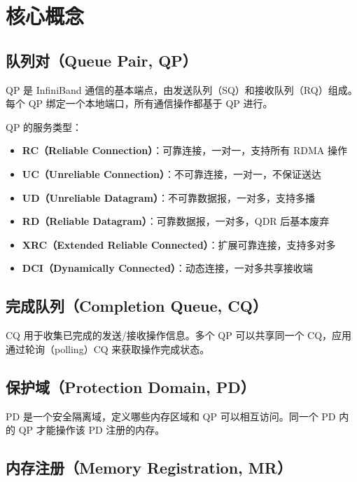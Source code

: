 
\section{核心概念}

\subsection{队列对（Queue Pair, QP）}

QP 是 InfiniBand 通信的基本端点，由发送队列（SQ）和接收队列（RQ）组成。每个 QP 绑定一个本地端口，所有通信操作都基于 QP 进行。

QP 的服务类型：

\begin{itemize}
  \item \textbf{RC（Reliable Connection）}：可靠连接，一对一，支持所有 RDMA 操作
  \item \textbf{UC（Unreliable Connection）}：不可靠连接，一对一，不保证送达
  \item \textbf{UD（Unreliable Datagram）}：不可靠数据报，一对多，支持多播
  \item \textbf{RD（Reliable Datagram）}：可靠数据报，一对多，QDR 后基本废弃
  \item \textbf{XRC（Extended Reliable Connected）}：扩展可靠连接，支持多对多
  \item \textbf{DCI（Dynamically Connected）}：动态连接，一对多共享接收端
\end{itemize}

\subsection{完成队列（Completion Queue, CQ）}

CQ 用于收集已完成的发送/接收操作信息。多个 QP 可以共享同一个 CQ，应用通过轮询（polling）CQ 来获取操作完成状态。

\subsection{保护域（Protection Domain, PD）}

PD 是一个安全隔离域，定义哪些内存区域和 QP 可以相互访问。同一个 PD 内的 QP 才能操作该 PD 注册的内存。

\subsection{内存注册（Memory Registration, MR）}

